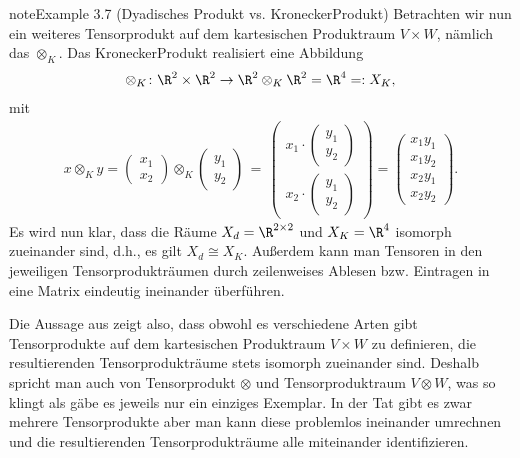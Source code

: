 \documentclass[letterpaper,10pt,english]{jupyterBook}
\begin{document}
\begin{sphinxadmonition}{note}{Example 3.7 (Dyadisches Produkt vs. Kronecker\sphinxhyphen{}Produkt)}
\sphinxAtStartPar
Betrachten wir nun ein weiteres Tensorprodukt auf dem kartesischen Produktraum \(V \times W\), nämlich das  \(\otimes_K\).
Das Kronecker\sphinxhyphen{}Produkt realisiert eine Abbildung
\begin{equation*}
\begin{split}\otimes_K \colon \R^2 \times \R^2 \rightarrow \R^2 \otimes_K \R^2 = \R^{4} =: X_K,\end{split}
\end{equation*}
\sphinxAtStartPar
mit
\begin{equation*}
\begin{split}x \otimes_K y =
\begin{pmatrix}
x_1 \\ x_2
\end{pmatrix} \otimes_K 
\begin{pmatrix}
y_1 \\ y_2
\end{pmatrix}
\, = \, 
\begin{pmatrix}
x_1 \cdot \begin{pmatrix} y_1 \\ y_2 \end{pmatrix} \\ 
x_2 \cdot \begin{pmatrix} y_1 \\ y_2 \end{pmatrix}
\end{pmatrix}
= 
\begin{pmatrix}
x_1y_1\\
x_1y_2\\
x_2y_1\\
x_2y_2
\end{pmatrix}.\end{split}
\end{equation*}
\sphinxAtStartPar
Es wird nun klar, dass die Räume \(X_d = \R^{2 \times 2}\) und \(X_K = \R^4\) isomorph zueinander sind, d.h., es gilt \(X_d \cong X_K\).
Außerdem kann man Tensoren in den jeweiligen Tensorprodukträumen durch zeilenweises Ablesen bzw. Eintragen in eine Matrix eindeutig ineinander überführen.
\end{sphinxadmonition}

\sphinxAtStartPar
{}

\sphinxAtStartPar
Die Aussage aus {\hyperref[\detokenize{vektoranalysis/tensor:lem:isomorphismusTensorproduktraum}]{}} zeigt also, dass obwohl es verschiedene Arten gibt Tensorprodukte auf dem kartesischen Produktraum \(V \times W\) zu definieren, die resultierenden Tensorprodukträume stets isomorph zueinander sind.
Deshalb spricht man auch von  Tensorprodukt \(\otimes\) und  Tensorproduktraum \(V \otimes W\), was so klingt als gäbe es jeweils nur ein einziges Exemplar.
In der Tat gibt es zwar mehrere Tensorprodukte aber man kann diese problemlos ineinander umrechnen und die resultierenden Tensorprodukträume alle miteinander identifizieren.
\end{document}
